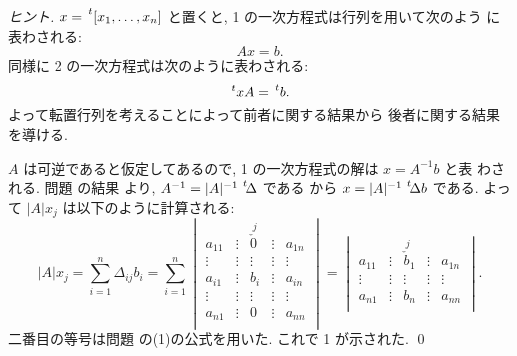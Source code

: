 \documentclass[12pt,twoside]{jarticle}
\begin{document}
\begin{proof}[ヒント]
  $x = \tp{[x_1,\ldots,x_n]}$ と置くと, 1 の一次方程式は行列を用いて次のよう
  に表わされる:
  \begin{equation*}
    Ax=b.
  \end{equation*}
  同様に 2 の一次方程式は次のように表わされる:
  \begin{equation*}
    \tp{x}A = \tp{b}.
  \end{equation*}
  よって転置行列を考えることによって前者に関する結果から
  後者に関する結果を導ける.

  $A$ は可逆であると仮定してあるので, 1 の一次方程式の解は $x=A^{-1}b$ と表
  わされる.  問題  の結果
  より, $A^{-1}=|A|^{-1}\,\tp{\!\Delta}$ である
  から $x=|A|^{-1}\,\tp{\!\Delta}b$ である.
  よって $|A|x_j$ は以下のように計算される:
  \begin{equation*}
    |A|x_j 
    = \sum_{i=1}^n \Delta_{ij} b_i 
    = \sum_{i=1}^n 
    \begin{vmatrix}
      a_{11} & \vdots & \overset{\;j}{\check{0}} & \vdots & a_{1n} \\
      \vdots & \vdots & \vdots  & \vdots & \vdots \\
      a_{i1} & \vdots &   b_i   & \vdots & a_{in} \\
      \vdots & \vdots & \vdots  & \vdots & \vdots \\
      a_{n1} & \vdots &    0    & \vdots & a_{nn} \\
    \end{vmatrix}
    =
    \begin{vmatrix}
      a_{11} & \vdots & \overset{\;j}{\check{b}}_1 & \vdots & a_{1n} \\
      \vdots & \vdots & \vdots & \vdots & \vdots \\
      a_{n1} & \vdots & b_n    & \vdots & a_{nn} \\
    \end{vmatrix}.
  \end{equation*}
  二番目の等号は問題  の(1)の公式を用いた.
  これで 1 が示された. \qed
\end{proof}

\end{document}
